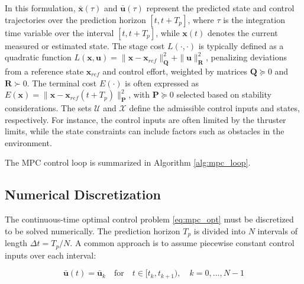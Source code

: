 In this formulation, $\boldsymbol{\bar{x}}(\tau)$ and $\mathbf{\bar{u}}(\tau)$ represent the predicted state and control trajectories over the prediction horizon $[t, t+T_p]$, where $\tau$ is the integration time variable over the interval $[t, t+T_p]$, while $\boldsymbol{x}(t)$ denotes the current measured or estimated state. The stage cost $L(\cdot, \cdot)$ is typically defined as a quadratic function $L(\boldsymbol{x}, \mathbf{u}) = \|\boldsymbol{x} - \boldsymbol{x}_{ref}\|_{\boldsymbol{Q}}^2 + \|\mathbf{u}\|_{\boldsymbol{R}}^2$, penalizing deviations from a reference state $\boldsymbol{x}_{ref}$ and control effort, weighted by matrices $\boldsymbol{Q} \succeq 0$ and $\boldsymbol{R} \succ 0$. The terminal cost $E(\cdot)$ is often expressed as $E(\boldsymbol{x}) = \|\boldsymbol{x} - \boldsymbol{x}_{ref}(t+T_p)\|_{\boldsymbol{P}}^2$, with $\boldsymbol{P} \succeq 0$ selected based on stability considerations. The sets $\mathcal{U}$ and $\mathcal{X}$ define the admissible control inputs and states, respectively. For instance, the control inputs are often limited by the thruster limits, while the state constraints can include factors such as obstacles in the environment.

The MPC control loop is summarized in Algorithm \ref{alg:mpc_loop}.

\begin{algorithm}[H]
\caption{MPC Control Loop}
\label{alg:mpc_loop}
\SetAlgoLined
{}
\end{algorithm}

\subsection{Numerical Discretization }

The continuous-time optimal control problem \eqref{eq:mpc_opt} must be discretized to be solved numerically. The prediction horizon $T_p$ is divided into $N$ intervals of length $\Delta t = T_p/N$. A common approach is to assume piecewise constant control inputs over each interval:

\begin{equation}
    \mathbf{\bar{u}}(t) = \mathbf{\bar{u}}_k \quad \text{for} \quad t \in [t_k, t_{k+1}), \quad k = 0, \dots, N-1
\end{equation}

